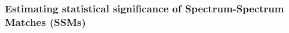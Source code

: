 \documentclass[arial,11pt]{article}
\begin{document}

\subsubsection{Estimating statistical significance of Spectrum-Spectrum Matches (SSMs)}\label{trd.snets.aim.sn.slgf}
\end{document}
